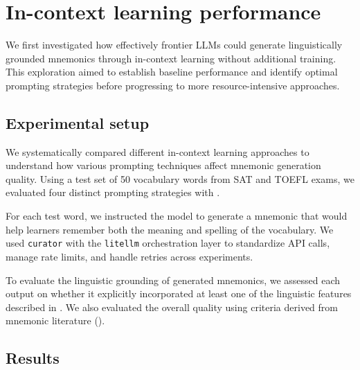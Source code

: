 \section{In-context learning performance} \label{sec:icl-performance}

We first investigated how effectively frontier LLMs could generate linguistically grounded mnemonics through in-context learning without additional training. This exploration aimed to establish baseline performance and identify optimal prompting strategies before progressing to more resource-intensive approaches.

\subsection{Experimental setup}
We systematically compared different in-context learning approaches to understand how various prompting techniques affect mnemonic generation quality. Using a test set of 50 vocabulary words from SAT and TOEFL exams, we evaluated four distinct prompting strategies with \teachermodel \citep{DeepSeek-AIDEEPSEEKR12025}.

For each test word, we instructed the model to generate a mnemonic that would help learners remember both the meaning and spelling of the vocabulary. We used \verb|curator| \citep{BespokeLabBESPOKE2025} with the \verb|litellm| orchestration layer to standardize API calls, manage rate limits, and handle retries across experiments.

To evaluate the linguistic grounding of generated mnemonics, we assessed each output on whether it explicitly incorporated at least one of the linguistic features described in . We also evaluated the overall quality using criteria derived from mnemonic literature ().

\subsection{Results} \label{sec:icl-results}

